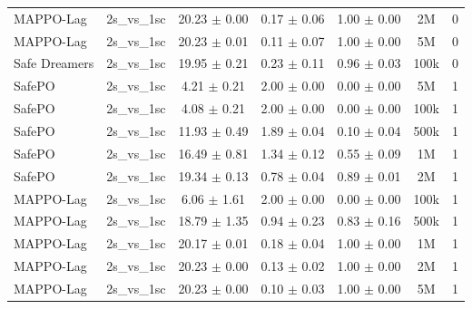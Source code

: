 \documentclass{article}
\begin{document}
\begin{longtable}{lcccccc}
MAPPO-Lag & 2s\_vs\_1sc & \textcolor{red!70!black}{20.23 $\pm$ 0.00} & \textcolor{red!70!black}{0.17 $\pm$ 0.06} & \textcolor{red!70!black}{1.00 $\pm$ 0.00} & 2M & 0 \\
MAPPO-Lag & 2s\_vs\_1sc & \textcolor{red!70!black}{20.23 $\pm$ 0.01} & \textcolor{red!70!black}{0.11 $\pm$ 0.07} & \textcolor{red!70!black}{1.00 $\pm$ 0.00} & 5M & 0 \\
Safe Dreamers & 2s\_vs\_1sc & 19.95 $\pm$ 0.21 & 0.23 $\pm$ 0.11 & 0.96 $\pm$ 0.03 & 100k & 0 \\
\midrule
SafePO & 2s\_vs\_1sc & \textcolor{green!60!black}{4.21 $\pm$ 0.21} & \textcolor{green!60!black}{2.00 $\pm$ 0.00} & \textcolor{green!60!black}{0.00 $\pm$ 0.00} & 5M & 1 \\
SafePO & 2s\_vs\_1sc & \textcolor{green!60!black}{4.08 $\pm$ 0.21} & \textcolor{green!60!black}{2.00 $\pm$ 0.00} & \textcolor{green!60!black}{0.00 $\pm$ 0.00} & 100k & 1 \\
SafePO & 2s\_vs\_1sc & \textcolor{green!60!black}{11.93 $\pm$ 0.49} & \textcolor{green!60!black}{1.89 $\pm$ 0.04} & \textcolor{green!60!black}{0.10 $\pm$ 0.04} & 500k & 1 \\
SafePO & 2s\_vs\_1sc & \textcolor{green!60!black}{16.49 $\pm$ 0.81} & \textcolor{green!60!black}{1.34 $\pm$ 0.12} & \textcolor{green!60!black}{0.55 $\pm$ 0.09} & 1M & 1 \\
SafePO & 2s\_vs\_1sc & \textcolor{green!60!black}{19.34 $\pm$ 0.13} & \textcolor{green!60!black}{0.78 $\pm$ 0.04} & \textcolor{green!60!black}{0.89 $\pm$ 0.01} & 2M & 1 \\
MAPPO-Lag & 2s\_vs\_1sc & \textcolor{green!60!black}{6.06 $\pm$ 1.61} & \textcolor{green!60!black}{2.00 $\pm$ 0.00} & \textcolor{green!60!black}{0.00 $\pm$ 0.00} & 100k & 1 \\
MAPPO-Lag & 2s\_vs\_1sc & \textcolor{green!60!black}{18.79 $\pm$ 1.35} & \textcolor{green!60!black}{0.94 $\pm$ 0.23} & \textcolor{green!60!black}{0.83 $\pm$ 0.16} & 500k & 1 \\
MAPPO-Lag & 2s\_vs\_1sc & \textcolor{red!70!black}{20.17 $\pm$ 0.01} & \textcolor{red!70!black}{0.18 $\pm$ 0.04} & \textcolor{red!70!black}{1.00 $\pm$ 0.00} & 1M & 1 \\
MAPPO-Lag & 2s\_vs\_1sc & \textcolor{red!70!black}{20.23 $\pm$ 0.00} & \textcolor{red!70!black}{0.13 $\pm$ 0.02} & \textcolor{red!70!black}{1.00 $\pm$ 0.00} & 2M & 1 \\
MAPPO-Lag & 2s\_vs\_1sc & \textcolor{red!70!black}{20.23 $\pm$ 0.00} & \textcolor{red!70!black}{0.10 $\pm$ 0.03} & \textcolor{red!70!black}{1.00 $\pm$ 0.00} & 5M & 1 \\

\end{longtable}
\end{document}
